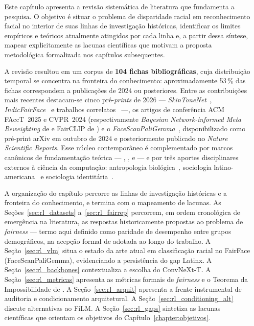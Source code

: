 Este capítulo apresenta a revisão sistemática de literatura que fundamenta a pesquisa. O objetivo é situar o problema de disparidade racial em reconhecimento facial no interior de suas linhas de investigação históricas, identificar os limites empíricos e teóricos atualmente atingidos por cada linha e, a partir dessa síntese, mapear explicitamente as lacunas científicas que motivam a proposta metodológica formalizada nos capítulos subsequentes.

A revisão resultou em um corpus de \textbf{104 fichas bibliográficas}, cuja distribuição temporal se concentra na fronteira do conhecimento: aproximadamente 53\,\% das fichas correspondem a publicações de 2024 ou posteriores. Entre as contribuições mais recentes destacam-se cinco pré-\emph{prints} de 2026 --- \emph{SkinToneNet}~\cite{matias2026large}, \emph{IndicFairFace}~\cite{mohsin2026indicfairfac} e trabalhos correlatos~\cite{lian2026closed,ozturk2026demographic,tan2026benchmarking} ---, os artigos de conferência ACM FAccT~2025 e CVPR~2024 (respectivamente \emph{Bayesian Network-informed Meta Reweighting} de  e FairCLIP de ) e o \emph{FaceScanPaliGemma}~\cite{aldahoul2024exploring}, disponibilizado como pré-print arXiv em outubro de 2024 e posteriormente publicado no \emph{Nature Scientific Reports}. Esse núcleo contemporâneo é complementado por marcos canônicos de fundamentação teórica --- , ,  e  --- e por três aportes disciplinares externos à ciência da computação: antropologia biológica~\cite{lewontin1972apportionmen,fuentes2019aapa}, sociologia latino-americana~\cite{telles2014pigmentocrac} e sociologia identitária~\cite{lopez2017hispanic}.

A organização do capítulo percorre as linhas de investigação históricas e a fronteira do conhecimento, e termina com o mapeamento de lacunas. As Seções~\ref{sec:rl_datasets} a~\ref{sec:rl_fairrep} percorrem, em ordem cronológica de emergência na literatura, as respostas historicamente propostas ao problema de \emph{fairness} --- termo aqui definido como paridade de desempenho entre grupos demográficos, na acepção formal de  adotada ao longo do trabalho. A Seção~\ref{sec:rl_vlm} situa o estado da arte atual em classificação racial no FairFace (FaceScanPaliGemma), evidenciando a persistência do gap Latinx. A Seção~\ref{sec:rl_backbones} contextualiza a escolha do ConvNeXt-T. A Seção~\ref{sec:rl_metricas} apresenta as métricas formais de \emph{fairness} e o Teorema da Impossibilidade de . A Seção~\ref{sec:rl_arquit} apresenta a frente instrumental de auditoria e condicionamento arquitetural. A Seção~\ref{sec:rl_conditioning_alt} discute alternativas ao FiLM. A Seção~\ref{sec:rl_gaps} sintetiza as lacunas científicas que orientam os objetivos do Capítulo~\ref{chapter:objetivos}.

